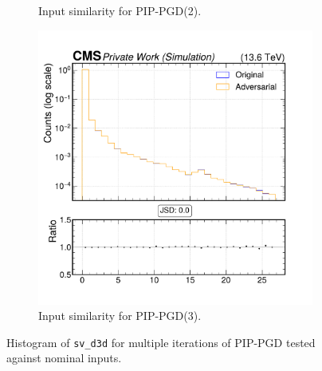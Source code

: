 \begin{figure}[h]
\begin{subfigure}[t]{0.32\textwidth}
    \caption*{Input similarity for PIP-PGD(2).}
  \end{subfigure}\hfill
  \begin{subfigure}[t]{0.32\textwidth}
    \includegraphics[width=\linewidth]{media/output/features/compare/combined_it_3/cmp_vtx_arr_sv_d3d.pdf}
    \caption*{Input similarity for PIP-PGD(3).}
  \end{subfigure}

  \caption*{Histogram of \texttt{sv\_d3d} for multiple iterations of PIP-PGD tested against nominal inputs.}
  \label{fig:combined_input_sv_d3d}
\end{figure}

